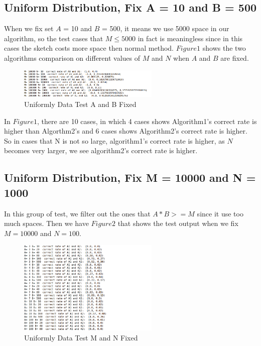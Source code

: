 \documentclass{article}
\begin{document}
\subsection{Uniform Distribution, Fix A = 10 and B = 500}
When we fix set $A$ = 10 and $B$ = 500, it means we use 5000 space in our algorithm, so the test cases that $M \leq 5000$ in fact is meaningless since in this cases the sketch costs more space then normal method. $Figure 1$ shows the two algorithms comparison on different values of $M$ and $N$ when $A$ and $B$ are fixed. 
\begin{figure}[h]
\begin{center}
\includegraphics[width=0.6\textwidth]{fixAandB} 
\caption{Uniformly Data Test A and B Fixed}
\end{center}
\end{figure}

In $Figure 1$, there are 10 cases, in which 4 cases shows Algorithm1's correct rate is higher than Algorthm2's and 6 cases shows Algorithm2's correct rate is higher. So in cases that N is not so large, algorithm1's correct rate is higher, as $N$ becomes very larger, we see algorithm2's correct rate is higher.

\subsection{Uniform Distribution, Fix M = 10000 and N = 1000}
In this group of test, we filter out the ones that $A*B>=M$ since it use too much spaces. Then we have $Figure 2$ that shows the test output when we fix $M = 10000$ and $N = 100$.
\begin{figure}[h]
\begin{center}
\includegraphics[width=0.6\textwidth]{fixMandN} 
\caption{Uniformly Data Test M and N Fixed}
\end{center}
\end{figure}
\end{document}
